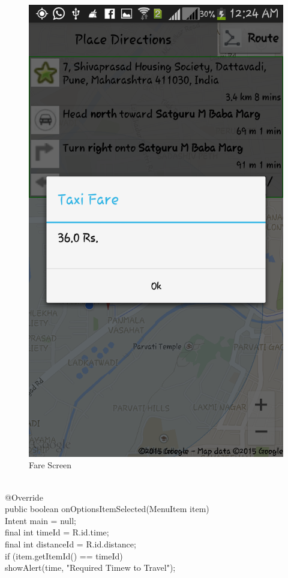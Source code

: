 \documentclass[12pt,a4paper]{article}
\begin{document}
{\begin{figure}[!htb]
\includegraphics[width=12 cm]{fare}
\caption{Fare Screen}
\end{figure}
\\
\hspace{0.7 cm}@Override\\
	public boolean onOptionsItemSelected(MenuItem item) {\\
		Intent main = null;\\
		final int timeId = R.id.time;\\
		final int distanceId = R.id.distance;\\
		if (item.getItemId() == timeId) {\\
			showAlert(time, "Required Timew to Travel");\\
}}}
\end{document}
